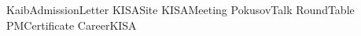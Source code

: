 \renewcommand\ExhibitGroup{Associations}

{KaibAdmissionLetter}
{KISASite}
{KISAMeeting}
{PokusovTalk}
{RoundTable}
{PMCertificate}
{CareerKISA}

